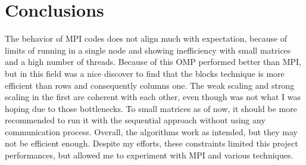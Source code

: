 \section{Conclusions}
The behavior of MPI codes does not align much with expectation, because of limits of running in a single node and showing inefficiency with small matrices and a high number of threads. Because of this OMP performed better than MPI, but in this field was a nice discover to find that the blocks technique is more efficient than rows and consequently columns one. The weak scaling and strong scaling in the first are coherent with each other, even though was not what I was hoping due to those bottlenecks.
To small matrices as of now, it should be more recommended to run it with the sequential approach without using any communication process. 
Overall, the algorithms work as intended, but they may not be efficient enough. Despite my efforts, these constraints limited this project performances, but allowed me to experiment with MPI and various techniques.

